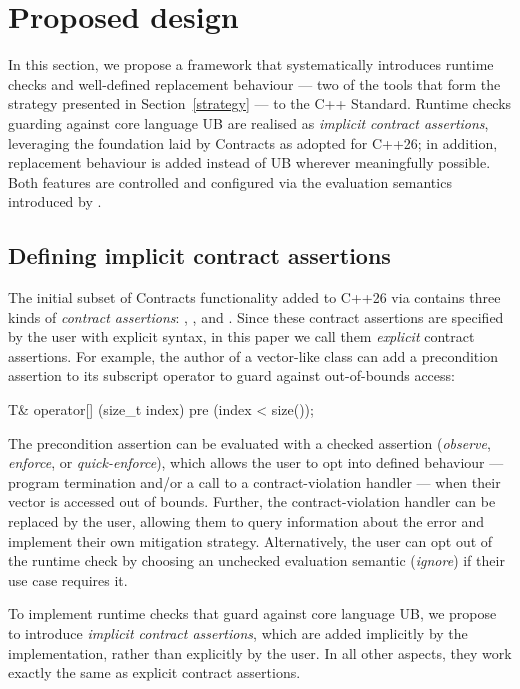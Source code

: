 {\section{Proposed design}
\label{design}

In this section, we propose a framework that systematically introduces runtime checks and well-defined replacement behaviour --- two of the tools that form the strategy presented in Section~\ref{strategy} --- to the C++ Standard. Runtime checks guarding against core language UB are realised as \emph{implicit contract assertions}, leveraging the foundation laid by Contracts as adopted for C++26; in addition, replacement behaviour is added instead of UB wherever meaningfully possible. Both features are controlled and configured via the evaluation semantics introduced by \cite{P2900R14}.

\subsection{Defining implicit contract assertions}
\label{defineicas}

The initial subset of Contracts functionality added to C++26 via \cite{P2900R14} contains three kinds of \emph{contract assertions}: , , and . Since these contract assertions are specified by the user with explicit syntax, in this paper we call them \emph{explicit} contract assertions. For example, the author of a vector-like class can add a precondition assertion to its subscript operator to guard against out-of-bounds access:

\begin{codeblock}
T& operator[] (size_t index)
  pre (index < size());
\end{codeblock}

The precondition assertion  can be evaluated with a checked assertion  (\emph{observe}, \emph{enforce}, or \emph{quick-enforce}), which allows the user to opt into defined behaviour --- program termination and/or a call to a contract-violation handler --- when their vector is accessed out of bounds. Further, the contract-violation handler can be replaced by the user, allowing them to query information about the error and implement their own mitigation strategy. Alternatively, the user can opt out of the runtime check by choosing an unchecked evaluation semantic (\emph{ignore}) if their use case requires it.

To implement runtime checks that guard against core language UB, we propose to introduce \emph{implicit contract assertions}, which are added implicitly by the implementation, rather than explicitly by the user. In all other aspects, they work exactly the same as explicit contract assertions.

}
